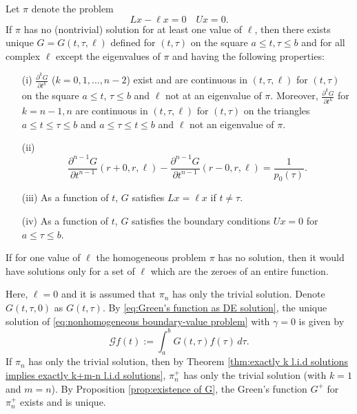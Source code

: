 \documentclass[11pt, oneside, a4paper]{article}
\begin{document}
{\begin{prop}\label{prop:existence of G}
    Let $\pi$ denote the problem
    \[Lx-\ell x = 0 \quad Ux=0.\]
    If $\pi$ has no (nontrivial) solution for at least one value of $\ell$, then there exists unique $G=G(t,\tau,\ell)$ defined for $(t,\tau)$ on the square $a\leq t,\tau\leq b$ and for all complex $\ell$ except the eigenvalues of $\pi$ and having the following properties:
    \begin{itemize}
        \item[(i)] $\frac{\partial ^k G}{\partial t^k}$ ($k=0,1,\ldots,n-2$) exist and are continuous in $(t,\tau,\ell)$ for $(t,\tau)$ on the square $a\leq t$, $\tau\leq b$ and $\ell$ not at an eigenvalue of $\pi$. Moreover, $\frac{\partial ^k G}{\partial t^k}$ for $k=n-1, n$ are continuous in $(t,\tau,\ell)$ for $(t,\tau)$ on the triangles $a\leq t\leq \tau\leq b$ and $a\leq \tau\leq t\leq b$ and $\ell$ not an eigenvalue of $\pi$.
        \item[(ii)]
        \[\frac{\partial^{n-1}G}{\partial t^{n-1}}(r+0, r, \ell) - \frac{\partial^{n-1}G}{\partial t^{n-1}}(r-0, r, \ell) = \frac{1}{p_0(\tau)}.\]
        \item[(iii)] As a function of $t$, $G$ satisfies $Lx=\ell x$ if $t\neq \tau$.
        \item[(iv)] As a function of $t$, $G$ satisfies the boundary conditions $Ux=0$ for $a\leq \tau\leq b$.
    \end{itemize}

    If for one value of $\ell$ the homogeneous problem $\pi$ has no solution, then it would have solutions only for a set of $\ell$ which are the zeroes of an entire function.
\end{prop}
}
Here, $\ell=0$ and it is assumed that $\pi_n$ has only the trivial solution. Denote $G(t,\tau,0)$ as $G(t,\tau)$. By \eqref{eq:Green's function as DE solution}, the unique solution of \ref{eq:nonhomogeneous boundary-value problem} with $\gamma=0$ is given by
\[\mathcal{G}f(t):=\int_a^b G(t,\tau)f(\tau)\,d\tau.\]
If $\pi_n$ has only the trivial solution, then by Theorem \ref{thm:exactly k l.i.d solutions implies exactly k+m-n l.i.d solutions}, $\pi_n^+$ has only the trivial solution (with $k=1$ and $m=n$). By Proposition \ref{prop:existence of G}, the Green's function $G^+$ for $\pi_n^+$ exists and is unique.
\end{document}
